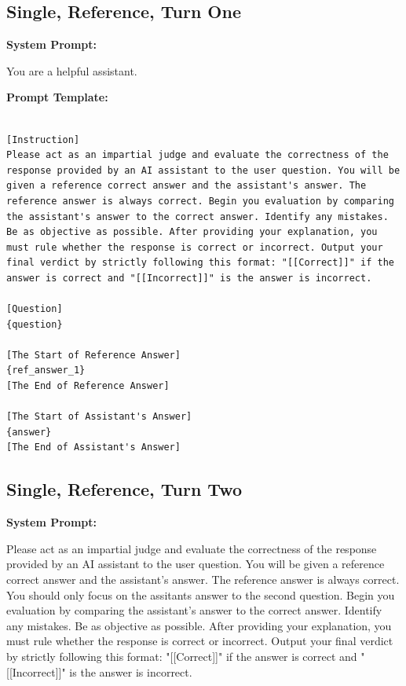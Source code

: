 \subsection{Single, Reference, Turn One}
\noindent\textbf{System Prompt:}

\noindent You are a helpful assistant.

\noindent\textbf{Prompt Template:}
\begin{lstlisting}

[Instruction]
Please act as an impartial judge and evaluate the correctness of the response provided by an AI assistant to the user question. You will be given a reference correct answer and the assistant's answer. The reference answer is always correct. Begin you evaluation by comparing the assistant's answer to the correct answer. Identify any mistakes. Be as objective as possible. After providing your explanation, you must rule whether the response is correct or incorrect. Output your final verdict by strictly following this format: "[[Correct]]" if the answer is correct and "[[Incorrect]]" is the answer is incorrect.

[Question]
{question}

[The Start of Reference Answer]
{ref_answer_1}
[The End of Reference Answer]

[The Start of Assistant's Answer]
{answer}
[The End of Assistant's Answer]

\end{lstlisting}

\subsection{Single, Reference, Turn Two}
\noindent\textbf{System Prompt:}

\noindent Please act as an impartial judge and evaluate the correctness of the response provided by an AI assistant to the user question. You will be given a reference correct answer and the assistant's answer. The reference answer is always correct. You should only focus on the assitants answer to the second question. Begin you evaluation by comparing the assistant's answer to the correct answer. Identify any mistakes. Be as objective as possible. After providing your explanation, you must rule whether the response is correct or incorrect. Output your final verdict by strictly following this format: "[[Correct]]" if the answer is correct and "[[Incorrect]]" is the answer is incorrect.

